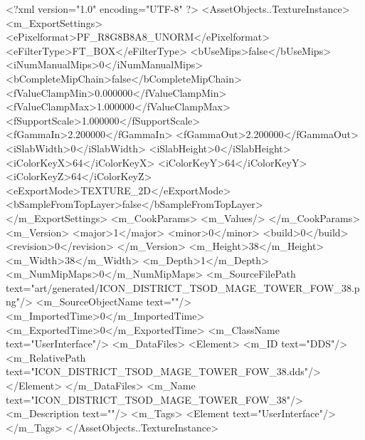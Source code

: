 <?xml version="1.0" encoding="UTF-8" ?>
<AssetObjects..TextureInstance>
	<m_ExportSettings>
		<ePixelformat>PF_R8G8B8A8_UNORM</ePixelformat>
		<eFilterType>FT_BOX</eFilterType>
		<bUseMips>false</bUseMips>
		<iNumManualMips>0</iNumManualMips>
		<bCompleteMipChain>false</bCompleteMipChain>
		<fValueClampMin>0.000000</fValueClampMin>
		<fValueClampMax>1.000000</fValueClampMax>
		<fSupportScale>1.000000</fSupportScale>
		<fGammaIn>2.200000</fGammaIn>
		<fGammaOut>2.200000</fGammaOut>
		<iSlabWidth>0</iSlabWidth>
		<iSlabHeight>0</iSlabHeight>
		<iColorKeyX>64</iColorKeyX>
		<iColorKeyY>64</iColorKeyY>
		<iColorKeyZ>64</iColorKeyZ>
		<eExportMode>TEXTURE_2D</eExportMode>
		<bSampleFromTopLayer>false</bSampleFromTopLayer>
	</m_ExportSettings>
	<m_CookParams>
		<m_Values/>
	</m_CookParams>
	<m_Version>
		<major>1</major>
		<minor>0</minor>
		<build>0</build>
		<revision>0</revision>
	</m_Version>
	<m_Height>38</m_Height>
	<m_Width>38</m_Width>
	<m_Depth>1</m_Depth>
	<m_NumMipMaps>0</m_NumMipMaps>
	<m_SourceFilePath text="art/generated/ICON_DISTRICT_TSOD_MAGE_TOWER_FOW_38.png"/>
	<m_SourceObjectName text=""/>
	<m_ImportedTime>0</m_ImportedTime>
	<m_ExportedTime>0</m_ExportedTime>
	<m_ClassName text="UserInterface"/>
	<m_DataFiles>
		<Element>
			<m_ID text="DDS"/>
			<m_RelativePath text="ICON_DISTRICT_TSOD_MAGE_TOWER_FOW_38.dds"/>
		</Element>
	</m_DataFiles>
	<m_Name text="ICON_DISTRICT_TSOD_MAGE_TOWER_FOW_38"/>
	<m_Description text=""/>
	<m_Tags>
		<Element text="UserInterface"/>
	</m_Tags>
</AssetObjects..TextureInstance>
